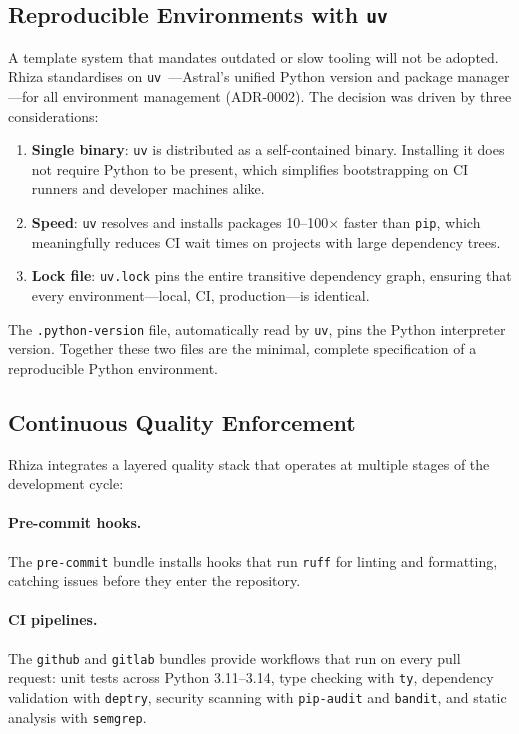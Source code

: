 \documentclass[12pt,a4paper]{article}
\begin{document}
\subsection{Reproducible Environments with \texttt{uv}}

A template system that mandates outdated or slow tooling will not be adopted. Rhiza standardises on \texttt{uv}~\cite{uv}---Astral's unified Python version and package manager---for all environment management (ADR-0002). The decision was driven by three considerations:

\begin{enumerate}[leftmargin=*]
  \item \textbf{Single binary}: \texttt{uv} is distributed as a self-contained binary. Installing it does not require Python to be present, which simplifies bootstrapping on CI runners and developer machines alike.
  \item \textbf{Speed}: \texttt{uv} resolves and installs packages 10--100$\times$ faster than \texttt{pip}, which meaningfully reduces CI wait times on projects with large dependency trees.
  \item \textbf{Lock file}: \texttt{uv.lock} pins the entire transitive dependency graph, ensuring that every environment---local, CI, production---is identical.
\end{enumerate}

The \texttt{.python-version} file, automatically read by \texttt{uv}, pins the Python interpreter version. Together these two files are the minimal, complete specification of a reproducible Python environment.

\subsection{Continuous Quality Enforcement}

Rhiza integrates a layered quality stack that operates at multiple stages of the development cycle:

\paragraph{Pre-commit hooks.} The \texttt{pre-commit} bundle installs hooks that run \texttt{ruff} for linting and formatting, catching issues before they enter the repository.

\paragraph{CI pipelines.} The \texttt{github} and \texttt{gitlab} bundles provide workflows that run on every pull request: unit tests across Python 3.11--3.14, type checking with \texttt{ty}, dependency validation with \texttt{deptry}, security scanning with \texttt{pip-audit} and \texttt{bandit}, and static analysis with \texttt{semgrep}.
\end{document}
